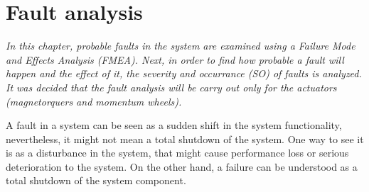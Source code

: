 \chapter{Fault  analysis}
\textit{In this chapter, probable faults in the system are examined using a  Failure Mode and Effects Analysis (FMEA). Next, in order to find how probable a fault will happen and the effect of it, the severity and occurrance (SO)   of faults is analyzed. It was decided that the fault analysis will be carry out only for the actuators (magnetorquers and momentum wheels).}

A fault in a system can be seen as a sudden shift in the system functionality, nevertheless, it might not mean a total shutdown of the system. One way to see it is as a disturbance in the system, that might cause performance loss or serious deterioration to the system. On the other hand, a failure can be understood as a total shutdown of the system component. 

